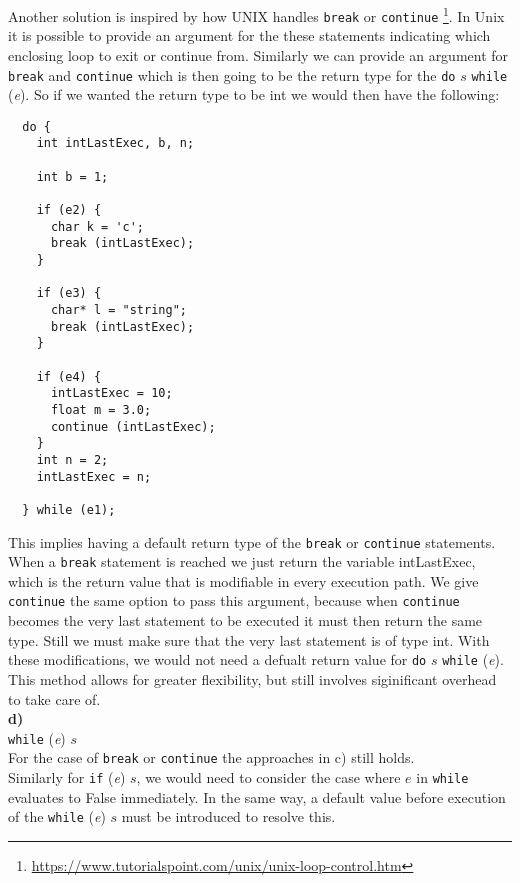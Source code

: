 Another solution is inspired by how UNIX handles \texttt{break} or \texttt{continue} \footnote{\url{https://www.tutorialspoint.com/unix/unix-loop-control.htm}}. In Unix it is possible to provide an argument for the these statements indicating which enclosing loop to exit or continue from. Similarly we can provide an argument for \texttt{break} and \texttt{continue} which is then going to be the return type for the \texttt{do} $s$ \texttt{while} (\textit{e}).
So if we wanted the return type to be int we would then have the following:
\begin{lstlisting}
  do {
    int intLastExec, b, n;

    int b = 1;

    if (e2) {
      char k = 'c';
      break (intLastExec);
    }

    if (e3) {
      char* l = "string";
      break (intLastExec);
    }

    if (e4) {
      intLastExec = 10;
      float m = 3.0;
      continue (intLastExec);
    }
    int n = 2;
    intLastExec = n;

  } while (e1);
\end{lstlisting}
This implies having a default return type of the \texttt{break} or \texttt{continue} statements. When a \texttt{break} statement is reached we just return the variable intLastExec, which is the return value that is modifiable in every execution path. We give \texttt{continue} the same option to pass this argument, because when \texttt{continue} becomes the very last statement to be executed it must then return the same type. Still we must make sure that the very last statement is of type int. With these modifications, we would not need a defualt return value for \texttt{do} $s$ \texttt{while} (\textit{e}). This method allows for greater flexibility, but still involves siginificant overhead to take care of.\\


\textbf{d)}\\
\texttt{while} (\textit{e}) $s$\\
For the case of \texttt{break} or \texttt{continue} the approaches in c) still holds.\\
Similarly for \texttt{if} (\textit{e}) $s$, we would need to consider the case where $e$ in \texttt{while} evaluates to False immediately. In the same way, a default value before execution of the \texttt{while} (\textit{e}) $s$ must be introduced to resolve this.\\


